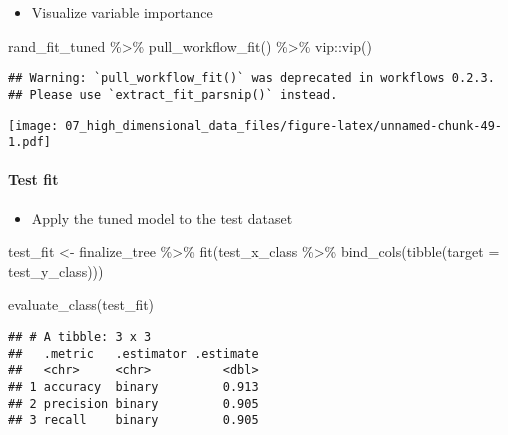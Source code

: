 \documentclass[
]{book}
\newenvironment{Shaded}{\begin{snugshade}}{\end{snugshade}}
\newcommand{\AttributeTok}[1]{\textcolor[rgb]{0.77,0.63,0.00}{#1}}
\newcommand{\FunctionTok}[1]{\textcolor[rgb]{0.00,0.00,0.00}{#1}}
\newcommand{\NormalTok}[1]{#1}
\newcommand{\OtherTok}[1]{\textcolor[rgb]{0.56,0.35,0.01}{#1}}
\newcommand{\SpecialCharTok}[1]{\textcolor[rgb]{0.00,0.00,0.00}{#1}}
\providecommand{\tightlist}{%
  \setlength{\itemsep}{0pt}\setlength{\parskip}{0pt}}
\begin{document}
\begin{itemize}
\tightlist
\item
  Visualize variable importance
\end{itemize}

\begin{Shaded}
\begin{Highlighting}[]
\NormalTok{rand\_fit\_tuned }\SpecialCharTok{\%\textgreater{}\%}
  \FunctionTok{pull\_workflow\_fit}\NormalTok{() }\SpecialCharTok{\%\textgreater{}\%}
\NormalTok{  vip}\SpecialCharTok{::}\FunctionTok{vip}\NormalTok{()}
\end{Highlighting}
\end{Shaded}

\begin{verbatim}
## Warning: `pull_workflow_fit()` was deprecated in workflows 0.2.3.
## Please use `extract_fit_parsnip()` instead.
\end{verbatim}

\texttt{[image: 07\_high\_dimensional\_data\_files/figure-latex/unnamed-chunk-49-1.pdf]}

\hypertarget{test-fit-2}{%
\paragraph{Test fit}\label{test-fit-2}}

\begin{itemize}
\tightlist
\item
  Apply the tuned model to the test dataset
\end{itemize}

\begin{Shaded}
\begin{Highlighting}[]
\NormalTok{test\_fit }\OtherTok{\textless{}{-}}\NormalTok{ finalize\_tree }\SpecialCharTok{\%\textgreater{}\%}
  \FunctionTok{fit}\NormalTok{(test\_x\_class }\SpecialCharTok{\%\textgreater{}\%}
    \FunctionTok{bind\_cols}\NormalTok{(}\FunctionTok{tibble}\NormalTok{(}\AttributeTok{target =}\NormalTok{ test\_y\_class)))}

\FunctionTok{evaluate\_class}\NormalTok{(test\_fit)}
\end{Highlighting}
\end{Shaded}

\begin{verbatim}
## # A tibble: 3 x 3
##   .metric   .estimator .estimate
##   <chr>     <chr>          <dbl>
## 1 accuracy  binary         0.913
## 2 precision binary         0.905
## 3 recall    binary         0.905
\end{verbatim}
\end{document}
